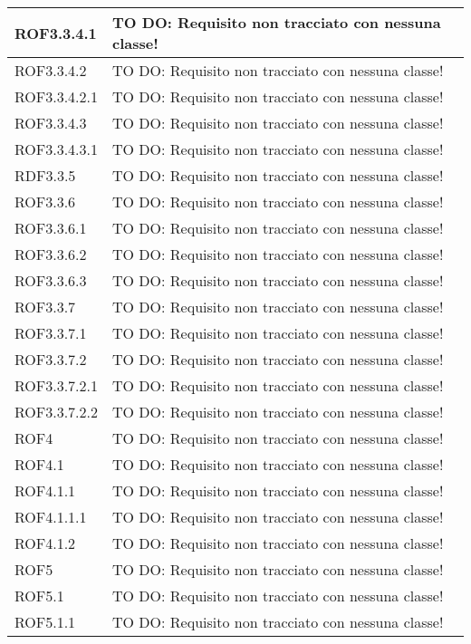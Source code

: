 \begin{center}
\begin{longtable}{| p{4cm} | p{8cm} |}
\hline
ROF3.3.4.1 & TO DO: Requisito non tracciato con nessuna classe! \\
\hline
ROF3.3.4.2 & TO DO: Requisito non tracciato con nessuna classe! \\
\hline
ROF3.3.4.2.1 & TO DO: Requisito non tracciato con nessuna classe! \\
\hline
ROF3.3.4.3 & TO DO: Requisito non tracciato con nessuna classe! \\
\hline
ROF3.3.4.3.1 & TO DO: Requisito non tracciato con nessuna classe! \\
\hline
RDF3.3.5 & TO DO: Requisito non tracciato con nessuna classe! \\
\hline
ROF3.3.6 & TO DO: Requisito non tracciato con nessuna classe! \\
\hline
ROF3.3.6.1 & TO DO: Requisito non tracciato con nessuna classe! \\
\hline
ROF3.3.6.2 & TO DO: Requisito non tracciato con nessuna classe! \\
\hline
ROF3.3.6.3 & TO DO: Requisito non tracciato con nessuna classe! \\
\hline
ROF3.3.7 & TO DO: Requisito non tracciato con nessuna classe! \\
\hline
ROF3.3.7.1 & TO DO: Requisito non tracciato con nessuna classe! \\
\hline
ROF3.3.7.2 & TO DO: Requisito non tracciato con nessuna classe! \\
\hline
ROF3.3.7.2.1 & TO DO: Requisito non tracciato con nessuna classe! \\
\hline
ROF3.3.7.2.2 & TO DO: Requisito non tracciato con nessuna classe! \\
\hline
ROF4 & TO DO: Requisito non tracciato con nessuna classe! \\
\hline
ROF4.1 & TO DO: Requisito non tracciato con nessuna classe! \\
\hline
ROF4.1.1 & TO DO: Requisito non tracciato con nessuna classe! \\
\hline
ROF4.1.1.1 & TO DO: Requisito non tracciato con nessuna classe! \\
\hline
ROF4.1.2 & TO DO: Requisito non tracciato con nessuna classe! \\
\hline
ROF5 & TO DO: Requisito non tracciato con nessuna classe! \\
\hline
ROF5.1 & TO DO: Requisito non tracciato con nessuna classe! \\
\hline
ROF5.1.1 & TO DO: Requisito non tracciato con nessuna classe! \\
\hline

\end{longtable}
\end{center}
